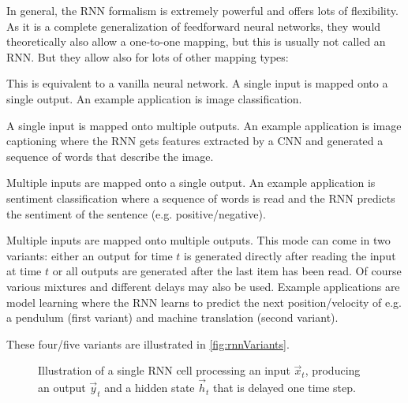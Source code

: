 	In general, the RNN formalism is extremely powerful and offers lots of flexibility. As it is a complete generalization of feedforward neural networks, they would theoretically also allow a one-to-one mapping, but this is usually not called an RNN. But they allow also for lots of other mapping types:
	\begin{description}[leftmargin = 3cm]
		\item[One-to-One]   This is equivalent to a vanilla neural network. A single input is mapped onto a single output. An example application is image classification.
		\item[One-to-Many]  A single input is mapped onto multiple outputs. An example application is image captioning where the RNN gets features extracted by a CNN and generated a sequence of words that describe the image.
		\item[Many-to-One]  Multiple inputs are mapped onto a single output. An example application is sentiment classification where a sequence of words is read and the RNN predicts the sentiment of the sentence (e.g. positive/negative).
		\item[Many-to-Many] Multiple inputs are mapped onto multiple outputs. This mode can come in two variants: either an output for time \(t\) is generated directly after reading the input at time \(t\) or all outputs are generated after the last item has been read. Of course various mixtures and different delays may also be used. Example applications are model learning where the RNN learns to predict the next position/velocity of e.g. a pendulum (first variant) and machine translation (second variant).
	\end{description}
	These four/five variants are illustrated in \autoref{fig:rnnVariants}.

	\begin{figure}
		\centering
		\caption{Illustration of a single RNN cell processing an input \(\vec{x}_t\), producing an output \(\vec{y}_t\) and a hidden state \(\vec{h}_t\) that is delayed one time step.}
		\label{fig:rnnCell}
	\end{figure}

